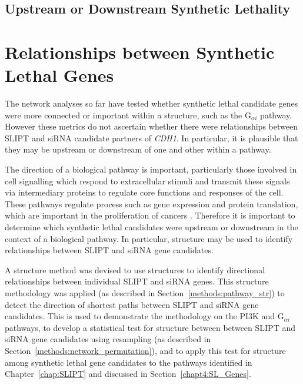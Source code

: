 \FloatBarrier

\subsection{Upstream or Downstream Synthetic Lethality}
\fi

\FloatBarrier

\section{Relationships between Synthetic Lethal Genes}

The network analyses so far have tested whether \gls{synthetic lethal} candidate genes were more connected or important within a  structure, such as the G$_{\alpha i}$ \gls{pathway}. However these metrics do not ascertain whether there were relationships between \gls{SLIPT} and \gls{siRNA} candidate partners of \textit{CDH1}. In particular, it is plausible that they may be upstream or downstream of one and other within a \gls{pathway}.

The direction of a biological \gls{pathway} is important, particularly those involved in cell signalling which respond to extracellular stimuli and transmit these signals via intermediary proteins to regulate core functions and responses of the cell. These \glspl{pathway} regulate process such as \gls{gene expression} and protein translation, which are important in the proliferation of cancers \citep{Gao2015}. Therefore it is important to determine which \gls{synthetic lethal} candidates were upstream or downstream in the context of a biological \gls{pathway}. In particular,  structure may be used to identify relationships between \gls{SLIPT} and \gls{siRNA} gene candidates.

A  structure method was devised to use  structures to identify directional relationships between individual \gls{SLIPT} and \gls{siRNA} genes. This  structure methodology was applied (as described in Section~\ref{methods:pathway_str}) to detect the direction of \glspl{shortest path} between \gls{SLIPT} and \gls{siRNA} gene candidates. This is used to demonstrate the methodology on the PI3K and G$_{\alpha i}$ \glspl{pathway}, to develop a statistical test for  structure between between \gls{SLIPT} and \gls{siRNA} gene candidates using resampling  (as described in Section~\ref{methods:network_permutation}), and to apply this test for  structure among \gls{synthetic lethal} gene candidates to the \glspl{pathway} identified in Chapter~\ref{chap:SLIPT} and discussed in Section~\ref{chapt4:SL_Genes}.

